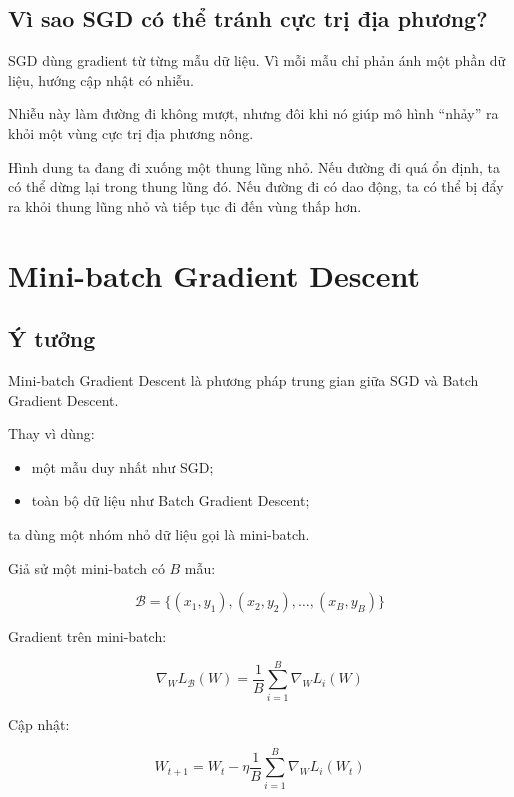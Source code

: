\subsection{Vì sao SGD có thể tránh cực trị địa phương?}

SGD dùng gradient từ từng mẫu dữ liệu. Vì mỗi mẫu chỉ phản ánh một phần dữ liệu, hướng cập nhật có nhiễu.

Nhiễu này làm đường đi không mượt, nhưng đôi khi nó giúp mô hình ``nhảy'' ra khỏi một vùng cực trị địa phương nông.

\begin{vidu}
Hình dung ta đang đi xuống một thung lũng nhỏ. Nếu đường đi quá ổn định, ta có thể dừng lại trong thung lũng đó. Nếu đường đi có dao động, ta có thể bị đẩy ra khỏi thung lũng nhỏ và tiếp tục đi đến vùng thấp hơn.
\end{vidu}

\section{Mini-batch Gradient Descent}

\subsection{Ý tưởng}

Mini-batch Gradient Descent là phương pháp trung gian giữa SGD và Batch Gradient Descent.

Thay vì dùng:

\begin{itemize}
    \item một mẫu duy nhất như SGD;
    \item toàn bộ dữ liệu như Batch Gradient Descent;
\end{itemize}

ta dùng một nhóm nhỏ dữ liệu gọi là mini-batch.

Giả sử một mini-batch có $B$ mẫu:

\[
    \mathcal{B}
    =
    \{(x_1,y_1),(x_2,y_2),\ldots,(x_B,y_B)\}
\]

Gradient trên mini-batch:

\[
    \nabla_W L_{\mathcal{B}}(W)
    =
    \frac{1}{B}
    \sum_{i=1}^{B}
    \nabla_W L_i(W)
\]

Cập nhật:

\[
    W_{t+1}
    =
    W_t
    -
    \eta
    \frac{1}{B}
    \sum_{i=1}^{B}
    \nabla_W L_i(W_t)
\]

